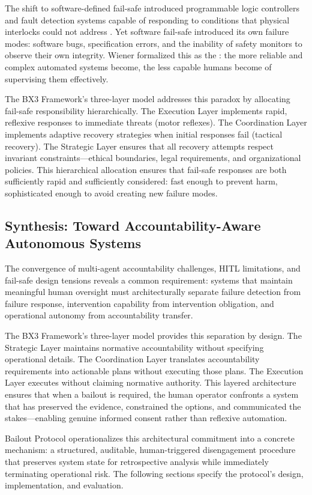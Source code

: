 The shift to software-defined fail-safe introduced programmable logic controllers and fault detection systems capable of responding to conditions that physical interlocks could not address \cite{bansal2019}. Yet software fail-safe introduced its own failure modes: software bugs, specification errors, and the inability of safety monitors to observe their own integrity. Wiener \cite{wiener1948} formalized this as the : the more reliable and complex automated systems become, the less capable humans become of supervising them effectively.

The BX3 Framework's three-layer model addresses this paradox by allocating fail-safe responsibility hierarchically. The Execution Layer implements rapid, reflexive responses to immediate threats (motor reflexes). The Coordination Layer implements adaptive recovery strategies when initial responses fail (tactical recovery). The Strategic Layer ensures that all recovery attempts respect invariant constraints—ethical boundaries, legal requirements, and organizational policies. This hierarchical allocation ensures that fail-safe responses are both sufficiently rapid and sufficiently considered: fast enough to prevent harm, sophisticated enough to avoid creating new failure modes.

\subsection{Synthesis: Toward Accountability-Aware Autonomous Systems}

The convergence of multi-agent accountability challenges, HITL limitations, and fail-safe design tensions reveals a common requirement: systems that maintain meaningful human oversight must architecturally separate failure detection from failure response, intervention capability from intervention obligation, and operational autonomy from accountability transfer.

The BX3 Framework's three-layer model provides this separation by design. The Strategic Layer maintains normative accountability without specifying operational details. The Coordination Layer translates accountability requirements into actionable plans without executing those plans. The Execution Layer executes without claiming normative authority. This layered architecture ensures that when a bailout is required, the human operator confronts a system that has preserved the evidence, constrained the options, and communicated the stakes—enabling genuine informed consent rather than reflexive automation.

Bailout Protocol operationalizes this architectural commitment into a concrete mechanism: a structured, auditable, human-triggered disengagement procedure that preserves system state for retrospective analysis while immediately terminating operational risk. The following sections specify the protocol's design, implementation, and evaluation.
